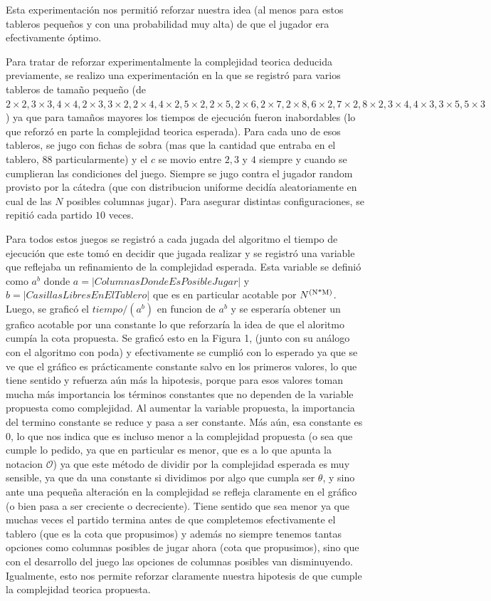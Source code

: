 \documentclass[A4paper,oneside,fleqn,11pt]{article}
\theoremstyle{definition}
\begin{document}
Esta experimentación nos permitió reforzar nuestra idea (al menos para estos tableros pequeños y con una probabilidad muy alta) de que el jugador era efectivamente óptimo.

Para tratar de reforzar experimentalmente la complejidad teorica deducida previamente, se realizo una experimentación en la que se registró para varios tableros de tamaño pequeño (de $2\times2, 3\times3, 4\times4, 2\times3, 3\times2, 2\times4, 4\times2, 5\times2, 2\times5, 2\times6, 2\times7, 2\times8, 6\times2, 7\times2, 8\times2, 3\times4, 4\times3, 3\times5, 5\times3$) ya que para tamaños mayores los tiempos de ejecución fueron inabordables (lo que reforzó en parte la complejidad teorica esperada). Para cada uno de esos tableros, se jugo con fichas de sobra (mas que la cantidad que entraba en el tablero, 88 particularmente) y el $c$ se movio entre $2, 3$ y $4$ siempre y cuando se cumplieran las condiciones del juego. Siempre se jugo contra el jugador random provisto por la cátedra (que con distribucion uniforme decidía aleatoriamente en cual de las $N$ posibles columnas jugar). Para asegurar distintas configuraciones, se repitió cada partido $10$ veces. 


Para todos estos juegos se registró a cada jugada del algoritmo el tiempo de ejecución que este tomó en decidir que jugada realizar y se registró una variable que reflejaba un refinamiento de la complejidad esperada. Esta variable se definió como $a^b$ donde $a=|Columnas Donde Es Posible Jugar|$ y $b =|Casillas Libres En El Tablero|$ que es en particular acotable por $N\textsuperscript{(N*M)}$. Luego, se graficó el $tiempo/(a^b)$ en funcion de $a^b$ y se esperaría obtener un grafico acotable por una constante lo que reforzaría la idea de que el aloritmo cumpía la cota propuesta. Se graficó esto en la Figura 1, (junto con su análogo con el algoritmo con poda) y efectivamente se cumplió con lo esperado ya que se ve que el gráfico es prácticamente constante salvo en los primeros valores, lo que tiene sentido y refuerza aún más la hipotesis, porque para esos valores toman mucha más importancia los términos constantes que no dependen de la variable propuesta como complejidad. Al aumentar la variable propuesta, la importancia del termino constante se reduce y pasa a ser constante. Más aún, esa constante es $0$, lo que nos indica que es incluso menor a la complejidad propuesta (o sea que cumple lo pedido, ya que en particular es menor, que es a lo que apunta la notacion $\mathcal{O}$) ya que este método de dividir por la complejidad esperada es muy sensible, ya que da una constante si dividimos por algo que cumpla ser $\theta$, y sino ante una pequeña alteración en la complejidad se refleja claramente en el gráfico (o bien pasa a ser creciente o decreciente). Tiene sentido que sea menor ya que muchas veces el partido termina antes de que completemos efectivamente el tablero (que es la cota que propusimos) y además no siempre tenemos tantas opciones como columnas posibles de jugar ahora (cota que propusimos), sino que con el desarrollo del juego las opciones de columnas posibles van disminuyendo. Igualmente, esto nos permite reforzar claramente nuestra hipotesis de que cumple la complejidad teorica propuesta.
\end{document}
